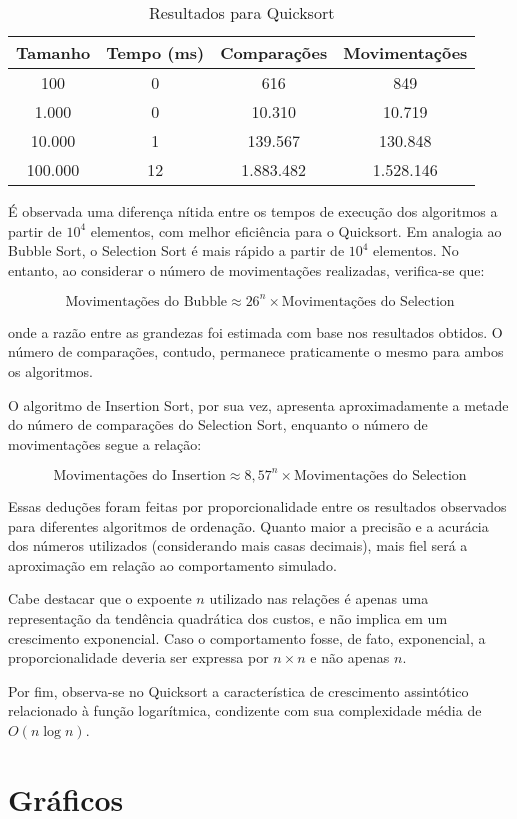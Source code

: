 \documentclass[12pt]{article}
\begin{document}
\begin{table}[H]
\centering
\caption{Resultados para Quicksort}
\begin{tabular}{|c|c|c|c|}
\hline
Tamanho & Tempo (ms) & Comparações & Movimentações \\
\hline
100 & 0 & 616 & 849 \\
1.000 & 0 & 10.310 & 10.719 \\
10.000 & 1 & 139.567 & 130.848 \\
100.000 & 12 & 1.883.482 & 1.528.146 \\
\hline
\end{tabular}
\end{table}
É observada uma diferença nítida entre os tempos de execução dos algoritmos a partir de $10^4$ elementos, com melhor eficiência para o Quicksort. Em analogia ao Bubble Sort, o Selection Sort é mais rápido a partir de $10^4$ elementos. No entanto, ao considerar o número de movimentações realizadas, verifica-se que:

\[
\text{Movimentações do Bubble} \approx 26^n \times \text{Movimentações do Selection}
\]

onde a razão entre as grandezas foi estimada com base nos resultados obtidos. O número de comparações, contudo, permanece praticamente o mesmo para ambos os algoritmos.

O algoritmo de Insertion Sort, por sua vez, apresenta aproximadamente a metade do número de comparações do Selection Sort, enquanto o número de movimentações segue a relação:

\[
\text{Movimentações do Insertion} \approx 8{,}57^n \times \text{Movimentações do Selection}
\]

Essas deduções foram feitas por proporcionalidade entre os resultados observados para diferentes algoritmos de ordenação. Quanto maior a precisão e a acurácia dos números utilizados (considerando mais casas decimais), mais fiel será a aproximação em relação ao comportamento simulado.

Cabe destacar que o expoente $n$ utilizado nas relações é apenas uma representação da tendência quadrática dos custos, e não implica em um crescimento exponencial. Caso o comportamento fosse, de fato, exponencial, a proporcionalidade deveria ser expressa por $n \times n$ e não apenas $n$.

Por fim, observa-se no Quicksort a característica de crescimento assintótico relacionado à função logarítmica, condizente com sua complexidade média de $O(n \log n)$.

\section{Gráficos}
\end{document}
